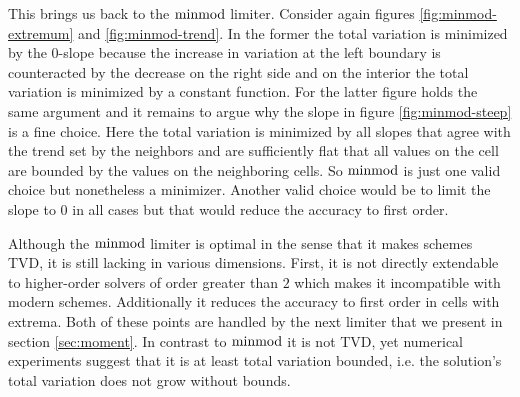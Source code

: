 This brings us back to the $\operatorname{minmod}$ limiter.
Consider again figures \ref{fig:minmod-extremum} and \ref{fig:minmod-trend}.
In the former the total variation is minimized by the $0$-slope because the increase in variation at the left boundary is counteracted by the decrease on the right side and on the interior the total variation is minimized by a constant function.
For the latter figure holds the same argument and it remains to argue why the slope in figure \ref{fig:minmod-steep} is a fine choice.
Here the total variation is minimized by all slopes that agree with the trend set by the neighbors and are sufficiently flat that all values on the cell are bounded by the values on the neighboring cells.
So $\operatorname{minmod}$ is just one valid choice but nonetheless a minimizer.
Another valid choice would be to limit the slope to $0$ in all cases but that would reduce the accuracy to first order.

Although the $\operatorname{minmod}$ limiter is optimal in the sense that it makes schemes TVD, it is still lacking in various dimensions.
First, it is not directly extendable to higher-order solvers of order greater than $2$ which makes it incompatible with modern schemes.
Additionally it reduces the accuracy to first order in cells with extrema.
Both of these points are handled by the next limiter that we present in section \ref{sec:moment}.
In contrast to $\operatorname{minmod}$ it is not TVD, yet numerical experiments suggest that it is at least total variation bounded, i.e. the solution's total variation does not grow without bounds.
